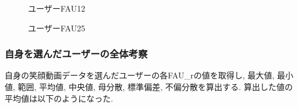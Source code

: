 \begin{figure}[htbp]
  \begin{minipage}{0.5\hsize}
    \begin{center}
    \end{center}
    \caption{ユーザーFAU12}
    \label{fig:userfau_12}
  \end{minipage}
  \begin{minipage}{0.5\hsize}
    \begin{center}
    \end{center}
    \caption{ユーザーFAU25}
    \label{fig:userfau_25}
  \end{minipage}
\end{figure}


\subsubsection{自身を選んだユーザーの全体考察}
自身の笑顔動画データを選んだユーザーの各FAU\_rの値を取得し, 最大値, 最小値, 範囲, 平均値, 中央値,
母分散, 標準偏差, 不偏分散を算出する.
算出した値の平均値は以下のようになった.

